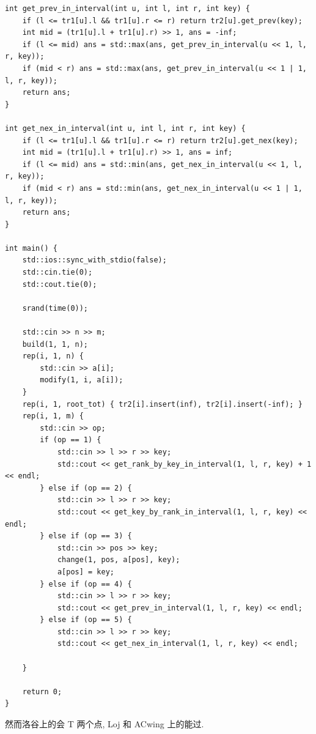 \documentclass[UTF8, a4paper, titlepage, twoside]{ctexart}
\begin{document}
\begin{lstlisting}
int get_prev_in_interval(int u, int l, int r, int key) {
    if (l <= tr1[u].l && tr1[u].r <= r) return tr2[u].get_prev(key);
    int mid = (tr1[u].l + tr1[u].r) >> 1, ans = -inf;
    if (l <= mid) ans = std::max(ans, get_prev_in_interval(u << 1, l, r, key));
    if (mid < r) ans = std::max(ans, get_prev_in_interval(u << 1 | 1, l, r, key));
    return ans;
}

int get_nex_in_interval(int u, int l, int r, int key) {
    if (l <= tr1[u].l && tr1[u].r <= r) return tr2[u].get_nex(key);
    int mid = (tr1[u].l + tr1[u].r) >> 1, ans = inf;
    if (l <= mid) ans = std::min(ans, get_nex_in_interval(u << 1, l, r, key));
    if (mid < r) ans = std::min(ans, get_nex_in_interval(u << 1 | 1, l, r, key));
    return ans;
}

int main() {
    std::ios::sync_with_stdio(false);
    std::cin.tie(0);
    std::cout.tie(0);

    srand(time(0));

    std::cin >> n >> m;
    build(1, 1, n);
    rep(i, 1, n) {
        std::cin >> a[i];
        modify(1, i, a[i]);
    }
    rep(i, 1, root_tot) { tr2[i].insert(inf), tr2[i].insert(-inf); }
    rep(i, 1, m) {
        std::cin >> op;
        if (op == 1) {
            std::cin >> l >> r >> key;
            std::cout << get_rank_by_key_in_interval(1, l, r, key) + 1 << endl;
        } else if (op == 2) {
            std::cin >> l >> r >> key;
            std::cout << get_key_by_rank_in_interval(1, l, r, key) << endl;
        } else if (op == 3) {
            std::cin >> pos >> key;
            change(1, pos, a[pos], key);
            a[pos] = key;
        } else if (op == 4) {
            std::cin >> l >> r >> key;
            std::cout << get_prev_in_interval(1, l, r, key) << endl;
        } else if (op == 5) {
            std::cin >> l >> r >> key;
            std::cout << get_nex_in_interval(1, l, r, key) << endl;
        
    }

    return 0;
}
\end{lstlisting}
然而洛谷上的会 T 两个点, Loj 和 ACwing 上的能过. 
\end{document}
